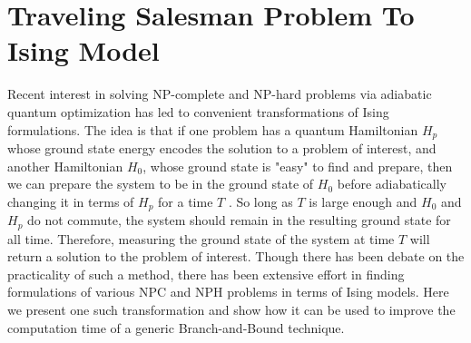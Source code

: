 \newpage
\section{Traveling Salesman Problem To Ising Model}
	Recent interest in solving NP-complete and NP-hard problems via adiabatic quantum optimization has led to convenient transformations of Ising formulations. The idea is that if one problem has a quantum Hamiltonian $H_p$ whose ground state energy encodes the solution to a problem of interest, and another Hamiltonian $H_0$, whose ground state is "easy" to find and prepare, then we can prepare the system to be in the ground state of $H_0$ before adiabatically changing it in terms of $H_p$ for a time $T$ \cite{lucas2014ising}. So long as $T$ is large enough and $H_0$ and $H_p$ do not commute, the system should remain in the resulting ground state for all time. Therefore, measuring the ground state of the system at time $T$ will return a solution to the problem of interest. Though there has been debate on the practicality of such a method, there has been extensive effort in finding formulations of various NPC and NPH problems in terms of Ising models. Here we present one such transformation and show how it can be used to improve the computation time of a generic Branch-and-Bound technique. 
